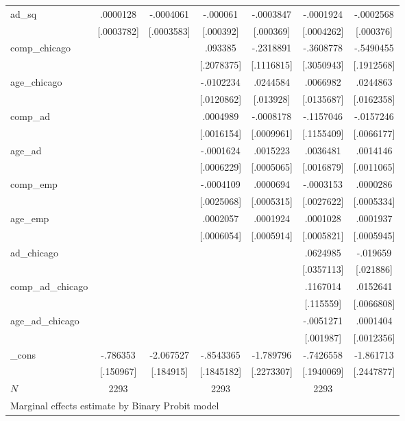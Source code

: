 \begin{tabular}{l*{6}{c}}
ad\_sq       &    .0000128&   -.0004061&    -.000061&   -.0003847&   -.0001924&   -.0002568\\
            &  [.0003782]&  [.0003583]&   [.000392]&   [.000369]&  [.0004262]&   [.000376]\\
comp\_chicago&            &            &     .093385&   -.2318891&   -.3608778&   -.5490455\\
            &            &            &  [.2078375]&  [.1116815]&  [.3050943]&  [.1912568]\\
age\_chicago &            &            &   -.0102234&    .0244584&    .0066982&    .0244863\\
            &            &            &  [.0120862]&   [.013928]&  [.0135687]&  [.0162358]\\
comp\_ad     &            &            &    .0004989&   -.0008178&   -.1157046&   -.0157246\\
            &            &            &  [.0016154]&  [.0009961]&  [.1155409]&  [.0066177]\\
age\_ad      &            &            &   -.0001624&    .0015223&    .0036481&    .0014146\\
            &            &            &  [.0006229]&  [.0005065]&  [.0016879]&  [.0011065]\\
comp\_emp    &            &            &   -.0004109&    .0000694&   -.0003153&    .0000286\\
            &            &            &  [.0025068]&  [.0005315]&  [.0027622]&  [.0005334]\\
age\_emp     &            &            &    .0002057&    .0001924&    .0001028&    .0001937\\
            &            &            &  [.0006054]&  [.0005914]&  [.0005821]&  [.0005945]\\
ad\_chicago  &            &            &            &            &    .0624985&    -.019659\\
            &            &            &            &            &  [.0357113]&   [.021886]\\
comp\_ad\_chicago&            &            &            &            &    .1167014&    .0152641\\
            &            &            &            &            &   [.115559]&  [.0066808]\\
age\_ad\_chicago&            &            &            &            &   -.0051271&    .0001404\\
            &            &            &            &            &   [.001987]&  [.0012356]\\
\_cons      &    -.786353&   -2.067527&   -.8543365&   -1.789796&   -.7426558&   -1.861713\\
            &   [.150967]&   [.184915]&  [.1845182]&  [.2273307]&  [.1940069]&  [.2447877]\\
\(N\)       &        2293&            &        2293&            &        2293&            \\
\multicolumn{7}{l}{\footnotesize  Marginal effects estimate by Binary Probit model}\\
\end{tabular}
